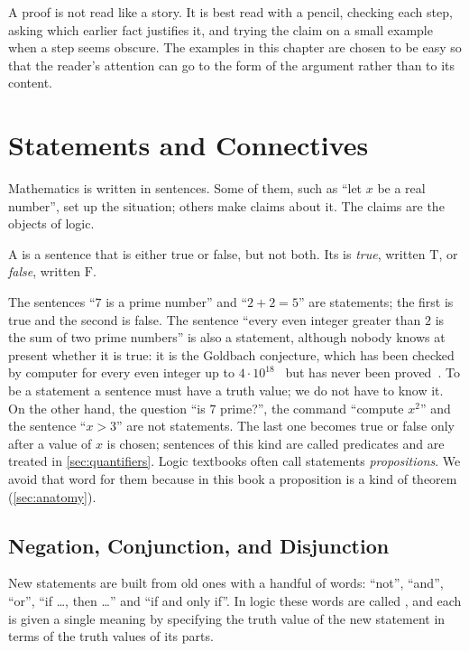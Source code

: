 A proof is not read like a story. It is best read with a pencil, checking each step, asking which earlier fact justifies it, and trying the claim on a small example when a step seems obscure. The examples in this chapter are chosen to be easy so that the reader's attention can go to the form of the argument rather than to its content.

\section{Statements and Connectives}
\label{sec:statements}

Mathematics is written in sentences. Some of them, such as ``let $x$ be a real number'', set up the situation; others make claims about it. The claims are the objects of logic.

\begin{definition}[Statement]
\label{def:statement}
A  is a sentence that is either true or false, but not both. Its  is \emph{true}, written $\mathrm T$, or \emph{false}, written $\mathrm F$.
\end{definition}

The sentences ``$7$ is a prime number'' and ``$2+2=5$'' are statements; the first is true and the second is false. The sentence ``every even integer greater than $2$ is the sum of two prime numbers'' is also a statement, although nobody knows at present whether it is true: it is the Goldbach conjecture, which has been checked by computer for every even integer up to $4\cdot10^{18}$~\cite{oliveiraesilva2014goldbach} but has never been proved~\cite{hardywright2008,ribenboim1996}. To be a statement a sentence must have a truth value; we do not have to know it. On the other hand, the question ``is $7$ prime?'', the command ``compute $x^2$'' and the sentence ``$x>3$'' are not statements. The last one becomes true or false only after a value of $x$ is chosen; sentences of this kind are called predicates and are treated in \cref{sec:quantifiers}. Logic textbooks often call statements \emph{propositions}. We avoid that word for them because in this book a proposition is a kind of theorem (\cref{sec:anatomy}).

\subsection{Negation, Conjunction, and Disjunction}

New statements are built from old ones with a handful of words: ``not'', ``and'', ``or'', ``if \ldots, then \ldots'' and ``if and only if''. In logic these words are called , and each is given a single meaning by specifying the truth value of the new statement in terms of the truth values of its parts.

